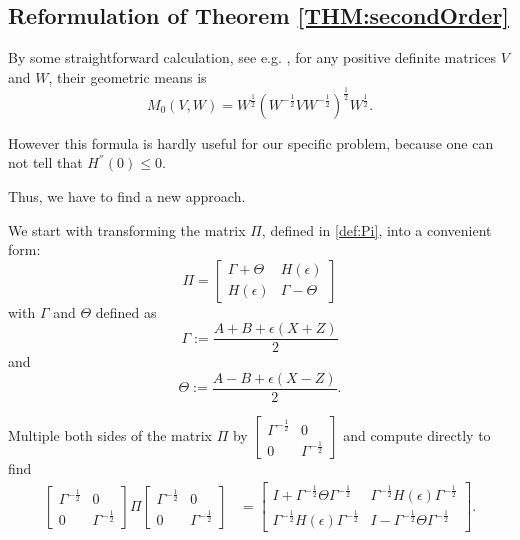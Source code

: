 \documentclass{article}
\numberwithin{equation}{section}
\begin{document}

\subsection{Reformulation of Theorem \ref{THM:secondOrder}}
By some straightforward calculation, see e.g. \cite{carlen2010trace}, for any positive definite matrices $V$ and $W$, their geometric means is
\begin{equation}\label{def:formuMeans}
M_0 (V, W) = W^{\frac{1}{2}} (W^{-\frac{1}{2}} V W^{-\frac{1}{2}})^{\frac{1}{2}} W^{\frac{1}{2}}.
\end{equation}

However this formula is hardly useful for our specific problem, because one can not tell that $H^{''}(0)\leq 0$. 

Thus, we have to find a new approach.

We start with transforming the matrix $\Pi$, defined in \eqref{def:Pi}, into a convenient form:
$$
\Pi = \begin{bmatrix} 
\Gamma + \Theta & H(\epsilon)\\ 
H(\epsilon) & \Gamma - \Theta 
\end{bmatrix}
$$ with $\Gamma$ and $\Theta$ defined as
$$\Gamma := \frac{A+ B+ \epsilon (X+Z)}{2}$$ and $$\Theta := \frac{A - B+ \epsilon (X-Z)}{2}.$$



Multiple both sides of the matrix $\Pi$ by $\begin{bmatrix}
\Gamma^{-\frac{1}{2}} & 0 \\
0 & \Gamma^{-\frac{1}{2}}
\end{bmatrix}$ and compute directly to find
\begin{align}
\begin{bmatrix}
\Gamma^{-\frac{1}{2}} & 0 \\
0 & \Gamma^{-\frac{1}{2}}
\end{bmatrix}
\Pi
\begin{bmatrix}
\Gamma^{-\frac{1}{2}} & 0 \\
0 & \Gamma^{-\frac{1}{2}}
\end{bmatrix}
&=
\begin{bmatrix} 
I + \Gamma^{-\frac{1}{2}} \Theta \Gamma^{-\frac{1}{2}} & \Gamma^{-\frac{1}{2}} H(\epsilon) \Gamma^{-\frac{1}{2}} \\ 
\Gamma^{-\frac{1}{2}} H(\epsilon) \Gamma^{-\frac{1}{2}} & I - \Gamma^{-\frac{1}{2}} \Theta \Gamma^{-\frac{1}{2}} 
\end{bmatrix}.
\end{align}
\end{document}
